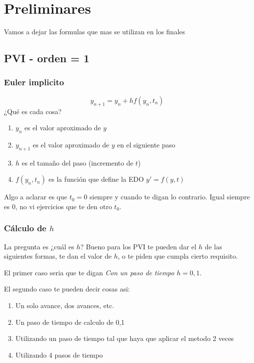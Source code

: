 \section{Preliminares}
Vamos a dejar las formulas que mas se utilizan en los finales 

\subsection{PVI - orden = 1}
\subsubsection{Euler implicito}
$$
    y_{n+1} = y_n + h  f(y_n, t_n)
$$
¿Qué es cada cosa?

 \begin{enumerate}
     \item {$y_n$} es el valor aproximado de $y$
     \item {$y_{n+1}$} es el valor aproximado de $y$ en el siguiente paso 
     \item {$h$} es el tamaño del paso (incremento de $t$) 
     \item {$f(y_n, t_n)$} es la función que define la EDO $y' = f(y,t)$
 \end{enumerate}
 
Algo a aclarar es que $t_0 = 0$ siempre y cuando te digan lo contrario. Igual siempre es 0, no vi ejercicios que te den otro $t_0$.

\subsubsection{Cálculo de $h$}

La pregunta es ¿cuál es $h$? Bueno para los PVI te pueden dar el $h$ de las siguientes formas, te dan el valor de $h$, o te piden que cumpla cierto requisito. 

El primer caso seria que te digan \textit{Con un paso de tiempo $h = 0,1$}.

El segundo caso te pueden decir cosas asi:

\begin{enumerate}
    \item {Un solo avance, dos avances, etc.}
    \item {Un paso de tiempo de calculo de 0,1}
    \item Utilizando un paso de tiempo tal que haya que aplicar el metodo 2 veces
    \item Utilizando 4 pasos de tiempo
\end{enumerate}

